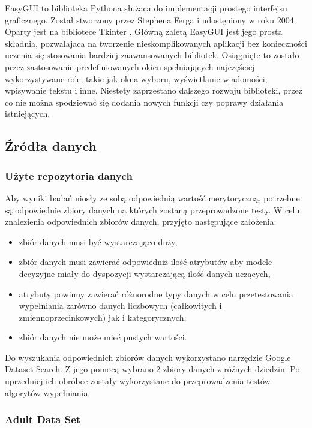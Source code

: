 \documentclass[12pt,twoside]{article}
\begin{document}
EasyGUI to biblioteka Pythona służaca do implementacji prostego interfejsu graficznego.
Został stworzony przez Stephena Ferga i udostęniony w roku 2004. Oparty jest na bibliotece Tkinter \cite{tkinter}.
Główną zaletą EasyGUI jest jego prosta składnia, pozwalajaca na tworzenie nieskomplikowanych aplikacji bez
konieczności uczenia się stosowania bardziej zaawansowanych bibliotek.
Osiągnięte to zostało przez zastosowanie predefiniowanych okien spełniających najczęściej wykorzystywane role,
takie jak okna wyboru, wyświetlanie wiadomości, wpisywanie tekstu i inne.
Niestety zaprzestano dalszego rozwoju biblioteki, przez co nie można spodziewać się dodania nowych funkcji
czy poprawy działania istniejących. \cite{easygui}

\subsection{Źródła danych}

\subsubsection{Użyte repozytoria danych}

Aby wyniki badań niosły ze sobą odpowiednią wartość merytoryczną,
potrzebne są odpowiednie zbiory danych na których zostaną przeprowadzone testy.
W celu znalezienia odpowiednich zbiorów danych, przyjęto następujące założenia:

\begin{itemize}[label=-,labelsep=0.4cm, leftmargin=1.25cm]
    \item zbiór danych musi być wystarczająco duży,
    \item zbiór danych musi zawierać odpowiedniż ilość atrybutów aby modele decyzyjne miały
          do dyspozycji wystarczającą ilość danych uczących,
    \item atrybuty powinny zawierać różnorodne typy danych w celu przetestowania wypełniania zarówno danych
          liczbowych (całkowitych i zmiennoprzecinkowych) jak i kategorycznych,
    \item zbiór danych nie może mieć pustych wartości.
\end{itemize}

Do wyszukania odpowiednich zbiorów danych wykorzystano narzędzie Google Dataset Search. \cite{googlesearch}\cite{googlesearch2}
Z jego pomocą wybrano 2 zbiory danych z róźnych dziedzin.
Po uprzedniej ich obróbce zostały wykorzystane do przeprowadzenia testów algorytów wypełniania.
\subsubsection{Adult Data Set}
\end{document}
